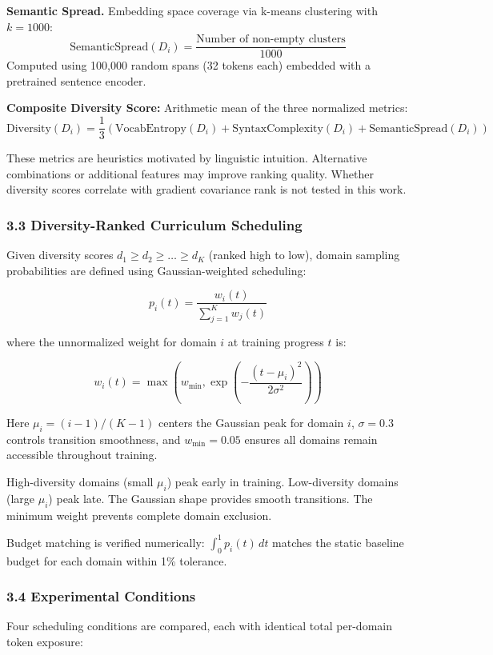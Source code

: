 \textbf{Semantic Spread.} Embedding space coverage via k-means clustering with $k=1000$:
$$\text{SemanticSpread}(D_i) = \frac{\text{Number of non-empty clusters}}{1000}$$
Computed using 100,000 random spans (32 tokens each) embedded with a pretrained sentence encoder.

\textbf{Composite Diversity Score:} Arithmetic mean of the three normalized metrics:
$$\text{Diversity}(D_i) = \frac{1}{3}\left(\text{VocabEntropy}(D_i) + \text{SyntaxComplexity}(D_i) + \text{SemanticSpread}(D_i)\right)$$

These metrics are heuristics motivated by linguistic intuition. Alternative combinations or additional features may improve ranking quality. Whether diversity scores correlate with gradient covariance rank is not tested in this work.

\subsubsection{3.3 Diversity-Ranked Curriculum Scheduling}

Given diversity scores $d_1 \geq d_2 \geq \ldots \geq d_K$ (ranked high to low), domain sampling probabilities are defined using Gaussian-weighted scheduling:

$$p_i(t) = \frac{w_i(t)}{\sum_{j=1}^K w_j(t)}$$

where the unnormalized weight for domain $i$ at training progress $t$ is:

$$w_i(t) = \max\left(w_{\min}, \exp\left(-\frac{(t - \mu_i)^2}{2\sigma^2}\right)\right)$$

Here $\mu_i = (i-1)/(K-1)$ centers the Gaussian peak for domain $i$, $\sigma = 0.3$ controls transition smoothness, and $w_{\min} = 0.05$ ensures all domains remain accessible throughout training.

High-diversity domains (small $\mu_i$) peak early in training. Low-diversity domains (large $\mu_i$) peak late. The Gaussian shape provides smooth transitions. The minimum weight prevents complete domain exclusion.

Budget matching is verified numerically: $\int_0^1 p_i(t) \, dt$ matches the static baseline budget for each domain within 1\% tolerance.

\subsubsection{3.4 Experimental Conditions}

Four scheduling conditions are compared, each with identical total per-domain token exposure:

